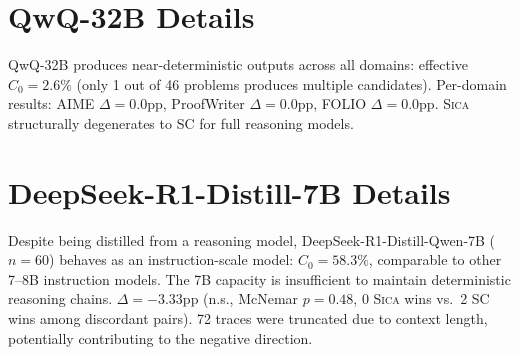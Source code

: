 \documentclass[11pt,a4paper]{article}
\newcommand{\sica}{\textsc{Sica}}
\begin{document}
\section{QwQ-32B Details}
\label{app:qwq}

QwQ-32B produces near-deterministic outputs across all domains: effective $C_0 = 2.6\%$ (only 1 out of 46 problems produces multiple candidates).
Per-domain results: AIME $\Delta=0.0$pp, ProofWriter $\Delta=0.0$pp, FOLIO $\Delta=0.0$pp.
\sica{} structurally degenerates to SC for full reasoning models.

\section{DeepSeek-R1-Distill-7B Details}
\label{app:deepseek}

Despite being distilled from a reasoning model, DeepSeek-R1-Distill-Qwen-7B ($n=60$) behaves as an instruction-scale model: $C_0=58.3\%$, comparable to other 7--8B instruction models.
The 7B capacity is insufficient to maintain deterministic reasoning chains.
$\Delta=-3.33$pp (n.s., McNemar $p=0.48$, 0 \sica{} wins vs.\ 2 SC wins among discordant pairs).
72 traces were truncated due to context length, potentially contributing to the negative direction.
\end{document}
